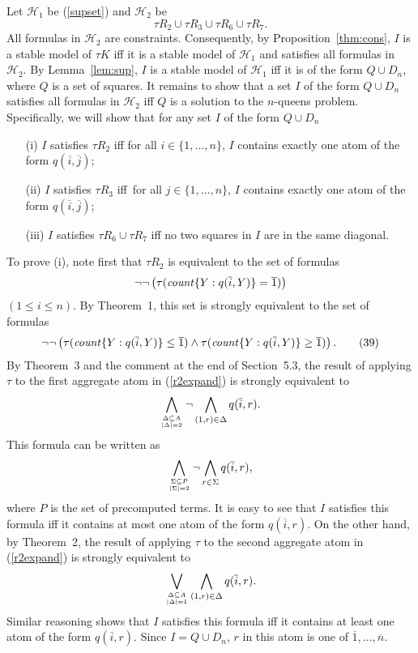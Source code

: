 \documentclass{tlp_mod}
\def\o{\overline}
\def\beq{\begin{equation}}
\def\eeq#1{\label{#1}\end{equation}}
\def\i#1{\hbox{\it #1\/}}
\begin{document}
\begin{proof*}
Let $\mathcal{H}_1$ be (\ref{supset}) and $\mathcal{H}_2$ be 
$$
\tau R_2 \cup \tau R_3 \cup \tau R_6 \cup \tau R_7.
$$
All formulas in $\mathcal{H}_2$ are constraints. Consequently, 
by Proposition~\ref{thm:cons}, $I$ is a stable 
model of $\tau K$ iff it is a stable model of $\mathcal{H}_1$ and satisfies all formulas in $\mathcal{H}_2$.  
By Lemma~\ref{lem:sup}, $I$ is a stable model of $\mathcal{H}_1$ iff it is 
of the form $Q \cup D_n$, where $Q$ is a set of squares. It remains to show 
that a set $I$ of the form $Q \cup D_n$ satisfies all formulas in 
$\mathcal{H}_2$ iff $Q$ is a solution to the $n$-queens problem.  
Specifically, we will show that for any set $I$ of the form $Q \cup D_n$
\begin{itemize}
\item[(i)] $I$ satisfies $\tau R_2$ iff for all $i \in \{1,\dots,n\}$, $I$ 
contains exactly one atom of the form $q(\o i, \o j)$;
\item[(ii)] $I$ satisfies $\tau R_3$ iff~for all $j \in \{1,\dots,n\}$, $I$ 
contains exactly one atom of the form $q(\o i, \o j)$;
\item[(iii)] $I$ satisfies $\tau R_6 \cup \tau R_7$ iff no two squares in $I$
are in the same diagonal.
\end{itemize}

To prove (i), note first that $\tau R_2$ is equivalent to  the set of formulas
$$
\neg \neg \left (\tau(\i{count}\{Y: q(\o i,Y)\} = \o 1) \right )
$$
$(1 \leq i \leq n)$. By Theorem~1, this set is strongly 
equivalent to the set of formulas 
\[
\neg \neg \left (\tau(\i{count}\{Y:
  q(\o i,Y)\} \leq \o 1) \land \tau(\i{count}\{Y: q(\o i,Y)\} \geq \o 1) 
  \right ).
\tag{39}
\label{r2expand}  
\]
By Theorem~3 and the comment at the end of Section~5.3,
the result of applying $\tau$ to 
the first aggregate atom in (\ref{r2expand}) is strongly equivalent to  
$$
\bigwedge_{\Delta \subseteq A \atop \lvert \Delta \rvert = 2} \neg 
  \bigwedge_{(1, r) \in \Delta} q(\o i, r).
$$
This formula can be written as   
$$
\bigwedge_{\Sigma \subseteq P \atop \lvert \Sigma \rvert = 2} \neg 
  \bigwedge_{r \in \Sigma} q(\o i, r),
$$
where $P$ is the set of precomputed terms. 
It is easy to see that $I$ satisfies this formula iff it contains at most 
one atom of the form  $q(\o i,r)$. On the other hand, by Theorem~2, 
the result of applying $\tau$ to the second aggregate atom in (\ref{r2expand}) 
is strongly equivalent to 
$$
  \bigvee_{\Delta \subseteq A \atop \lvert \Delta \rvert = 1} 
  \bigwedge_{(1, r) \in\Delta} q(\o i, r). 
$$
Similar reasoning shows that $I$ satisfies this formula iff it 
contains at least
one atom of the form  $q(\o i,r)$. Since $I = Q \cup D_n$,  
$r$ in this atom is one of $\o 1,\dots, \o n$.  


\end{proof*}
\end{document}
